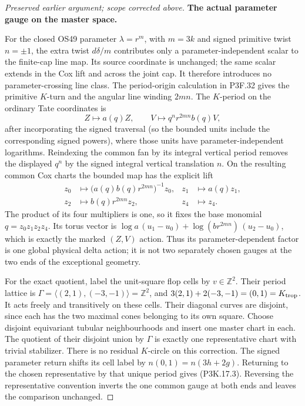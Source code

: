 \begin{proof}[Preserved earlier argument; scope corrected above]
\par\medskip\noindent\textbf{The actual parameter gauge on the master space.}\enspace

For the closed OS49 parameter \(\lambda=r^m\), with
\(m=3k\) and signed primitive twist \(n=\pm1\), the
extra twist \(d\delta/m\) contributes only a parameter-independent
scalar to the finite-cap line map.  Its source coordinate is unchanged;
the same scalar extends in the Cox lift and across the joint cap.
It therefore introduces no parameter-crossing line class.  The
period-origin calculation in P3F.32 gives the primitive
\(K\)-turn and the angular line winding \(2mn\).
The \(K\)-period on the ordinary Tate coordinates is
\[
      Z\longmapsto a(q)Z,\qquad
      V\longmapsto q^n r^{2mn}b(q)V,
\]
after incorporating the signed traversal (so the bounded units
include the corresponding signed powers), where those units
have parameter-independent logarithms.  Reindexing
the common fan by its integral vertical period removes the
displayed \(q^n\) by the signed integral vertical translation
\(n\).  On the resulting common Cox charts the
bounded map has the explicit lift
\[
 \begin{aligned}
 z_0&\longmapsto\bigl(a(q)b(q)r^{2mn}\bigr)^{-1}z_0,
       &z_1&\longmapsto a(q)z_1,\\
 z_2&\longmapsto b(q)r^{2mn}z_2,
       &z_4&\longmapsto z_4.
 \end{aligned}                                      \tag{P3K.17.3}
\]
The product of its four multipliers is one, so it fixes the
base monomial \(q=z_0z_1z_2z_4\).  Its torus vector is
\(\log a\,(u_1-u_0)+\log(br^{2mn})\,(u_2-u_0)\),
which is exactly the marked \((Z,V)\) action.  Thus its
parameter-dependent factor is one global physical delta
action; it is not two separately chosen gauges at the two
ends of the exceptional geometry.

For the exact quotient, label the unit-square flop cells by
\(v\in\mathbb Z^2\).  Their period lattice is
\(\Gamma=\langle(2,1),(-3,-1)\rangle=\mathbb Z^2\),
and \(3(2,1)+2(-3,-1)=(0,1)=K_{\rm trop}\).
It acts freely and transitively on these cells.  Their diagonal
curves are disjoint, since each has the two maximal cones
belonging to its own square.  Choose disjoint equivariant
tubular neighbourhoods and insert one master chart in each.
The quotient of their disjoint union by \(\Gamma\) is
exactly one representative chart with trivial stabilizer.
There is no residual \(K\)-circle on this correction.
The signed parameter return shifts its cell label by
\(n(0,1)=n(3h+2g)\).  Returning to the chosen representative
by that unique period gives (P3K.17.3).  Reversing the
representative convention inverts the one common gauge at
both ends and leaves the comparison unchanged.


\end{proof}
